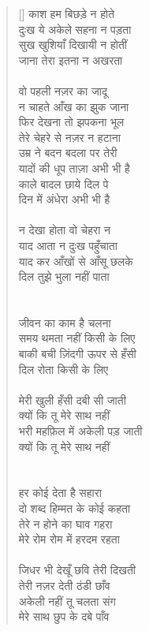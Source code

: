 \begin{verse}[\versewidth]\texthindi{
काश हम बिछड़े न होते\\
दुःख ये अकेले सहना न पड़ता\\
सुख खुशियाँ दिखायी न होतीं\\
जाना तेरा इतना न अखरता\\
\\
वो पहली नज़र का जादू\\
न चाहते आँख का झुक जाना\\
फिर देखना तो झपकना भूल\\
तेरे चेहरे से नज़र न हटाना\\
उम्र ने बदन बदला पर तेरी\\
यादों की धूप ताज़ा अभी भी है\\
काले बादल छाये दिल पे\\
दिन में अंधेरा अभी भी है\\
\\
न देखा होता वो चेहरा न\\
याद आता न दुःख पहुँचाता\\
याद कर आँखों से आँसू छलके\\
दिल तुझे भुला नहीं पाता\\
\\
\\
जीवन का काम है चलना\\
समय थमता नहीं किसी के लिए\\
बाकी बची ज़िंदगी ऊपर से हँसी\\
दिल रोता किसी के लिए\\
\\
मेरी खुली हँसी दबी सी जाती\\
क्यों कि तू मेरे साथ नहीं\\
भरी महफ़िल में अकेली पड़ जाती\\
क्यों कि तू मेरे साथ नहीं\\
\\
\\
हर कोई देता है सहारा\\
दो शब्द हिम्मत के कोई कहता\\
तेरे न होने का घाव गहरा\\
मेरे रोम रोम में हरदम रहता\\
\\
जिधर भी देखूँ छवि तेरी दिखती\\
तेरी नज़र देती ठंडी छाँव\\
अकेली नहीं तू चलता संग\\
मेरे साथ छुप के दबे पाँव\\
}
\end{verse}
